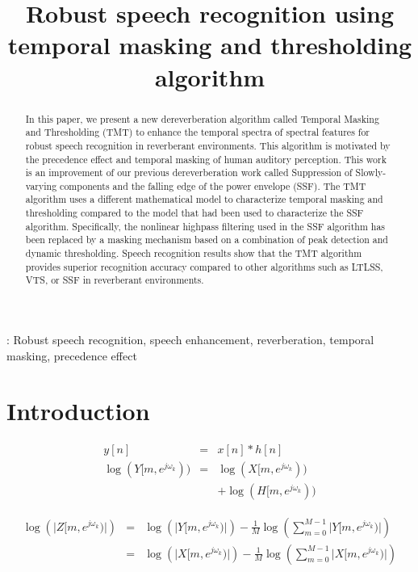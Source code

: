 \documentclass[a4paper]{article}
\title{Robust speech recognition using temporal masking and thresholding algorithm}
\begin{document}
\maketitle
%
\begin{abstract}
In this paper, we present a new dereverberation algorithm called
 Temporal Masking and Thresholding (TMT) to enhance the temporal
 spectra of spectral features for robust speech recognition
 in reverberant environments. This algorithm is motivated
 by the precedence effect and temporal masking of human
 auditory perception. This work is an improvement
 of our previous dereverberation work called Suppression of 
 Slowly-varying components and the falling edge of the power
 envelope (SSF).  The TMT algorithm  uses a different mathematical
 model to characterize temporal masking and thresholding compared
 to the model that had been used to characterize the SSF algorithm.
 Specifically, the nonlinear highpass filtering used in the SSF
 algorithm has been replaced by a masking mechanism
 based on a combination of peak detection and dynamic thresholding.
 Speech recognition results show that the TMT algorithm provides
 superior recognition accuracy compared to other algorithms such
 as LTLSS, VTS, or SSF in reverberant environments.

\end{abstract}
: Robust speech recognition, speech enhancement, reverberation,
temporal masking, precedence effect


%
\section{Introduction}

\begin{eqnarray}
  y[n] & = & x[n] * h[n]  \nonumber \\
  \log (Y[m, e^{j \omega_k})) & = & \log(X[m, e^{j \omega_k}))  \nonumber \\
            && + \log(H[m, e^{j \omega_k}))  \nonumber
\end{eqnarray}

\begin{eqnarray}
 \log   \left(\Big| Z[m, e^{j \omega_k}) \Big| \right)  & = &  \log \left(\Big| Y[m, e^{j \omega_k}) \Big| \right)  
  - \frac{1}{M} \log \left( \sum_{m = 0}^{M - 1} \Big| Y[m, e^{j \omega_k}) \Big| \right) \nonumber \\
&=& \log \left(\Big| X[m, e^{j \omega_k}) \Big| \right) 
 - \frac{1}{M} \log \left( \sum_{m = 0}^{M - 1} \Big| X[m, e^{j \omega_k}) \Big| \right) \nonumber
\end{eqnarray}
\end{document}
